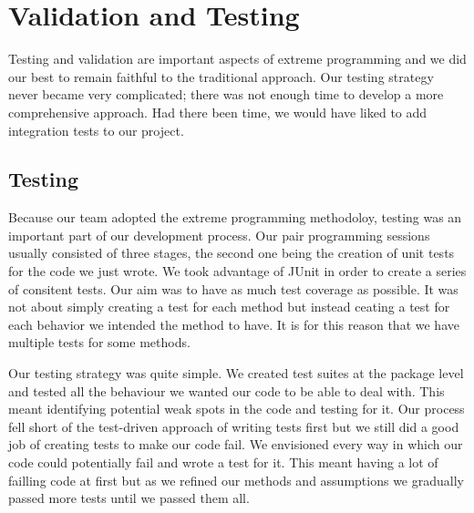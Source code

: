 \chapter{Validation and Testing}
\label{cha:validation}

%
% 

Testing and validation are important aspects of extreme programming
and we did our best to remain faithful to the traditional
approach. Our testing strategy never became very complicated; there
was not enough time to develop a more comprehensive approach. Had
there been time, we would have liked to add integration tests to our
project.

\section{Testing}

Because our team adopted the extreme programming methodoloy, testing
was an important part of our development process. Our pair programming
sessions usually consisted of three stages, the second one being the
creation of unit tests for the code we just wrote. We took advantage
of JUnit in order to create a series of consitent tests. Our aim was
to have as much test coverage as possible. It was not about simply
creating a test for each method but instead ceating a test for each
behavior we intended the method to have. It is for this reason that we
have multiple tests for some methods.

Our testing strategy was quite simple. We created test suites at the
package level and tested all the behaviour we wanted our code to be
able to deal with. This meant identifying potential weak spots in the
code and testing for it. Our process fell short of the test-driven
approach of writing tests first but we still did a good job of
creating tests to make our code fail. We envisioned every way in which
our code could potentially fail and wrote a test for it. This meant
having a lot of failling code at first but as we refined our methods
and assumptions we gradually passed more tests until we passed them
all.

